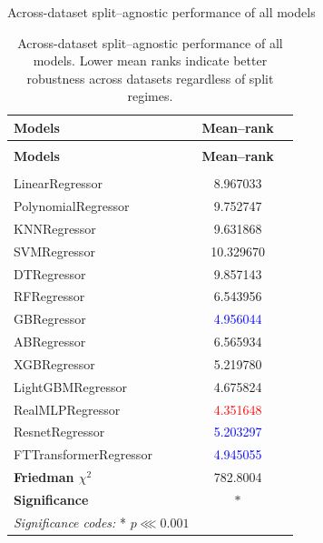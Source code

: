 \begin{frame}{Across-dataset split–agnostic performance of all models}
    \tiny
    \begin{longtable}{lcc}
    \caption{Across-dataset split–agnostic performance of all models. Lower mean ranks indicate better robustness across datasets regardless of split regimes.}
    \label{tab:split_agnostic_rank} \\
    \toprule
    \textbf{Models} &
    \textbf{Mean–rank} \\
    \midrule
    \endfirsthead

    \multicolumn{1}{c}{} \\
    \toprule
    \textbf{Models} &
    \textbf{Mean–rank} \\
    \midrule
    \endhead

    \midrule
    \multicolumn{1}{r}{} \\
    \endfoot

    \bottomrule
    \endlastfoot

    LinearRegressor & 8.967033 \\

    PolynomialRegressor & 9.752747 \\

    KNNRegressor & 9.631868 \\

    SVMRegressor & 10.329670 \\

    DTRegressor & 9.857143 \\

    RFRegressor & 6.543956 \\

    GBRegressor & \textcolor{blue}{4.956044} \\

    ABRegressor & 6.565934 \\

    XGBRegressor & 5.219780 \\

    LightGBMRegressor & 4.675824 \\

    RealMLPRegressor & \textcolor{red}{4.351648} \\

    ResnetRegressor & \textcolor{blue}{5.203297} \\

    FTTransformerRegressor & \textcolor{blue}{4.945055} \\

    \addlinespace
    \midrule
    \textbf{Friedman $\chi^2$} &
    782.8004 \\

    \textbf{Significance} &
    $\ast$ \\

    \multicolumn{1}{l}{\footnotesize
    \tiny \textit{Significance codes:} * $p \lll  0.001$}
    \\
    \end{longtable}
\end{frame}


